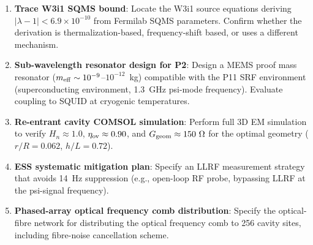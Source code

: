 \documentclass[11pt,twocolumn]{article}
\newcommand{\lam}{\lambda}
\newcommand{\ee}[1]{\times 10^{#1}}
\begin{document}
\begin{enumerate}
\item \textbf{Trace W3i1 SQMS bound}: Locate the W3i1 source equations
  deriving $|\lam-1| < 6.9\ee{-10}$ from Fermilab SQMS parameters.
  Confirm whether the derivation is thermalization-based, frequency-shift
  based, or uses a different mechanism.

\item \textbf{Sub-wavelength resonator design for P2}: Design a MEMS proof
  mass resonator ($m_{\rm eff} \sim 10^{-9}$--$10^{-12}$~kg) compatible
  with the P11 SRF environment (superconducting environment, 1.3~GHz
  psi-mode frequency). Evaluate coupling to SQUID at cryogenic temperatures.

\item \textbf{Re-entrant cavity COMSOL simulation}: Perform full 3D EM
  simulation to verify $H_n \approx 1.0$, $\eta_{\rm ov} \approx 0.90$,
  and $G_{\rm geom} \approx 150~\Omega$ for the optimal geometry
  ($r/R = 0.062$, $h/L = 0.72$).

\item \textbf{ESS systematic mitigation plan}: Specify an LLRF measurement
  strategy that avoids 14~Hz suppression (e.g., open-loop RF probe,
  bypassing LLRF at the psi-signal frequency).

\item \textbf{Phased-array optical frequency comb distribution}: Specify
  the optical-fibre network for distributing the optical frequency comb
  to 256 cavity sites, including fibre-noise cancellation scheme.
\end{enumerate}
\end{document}
